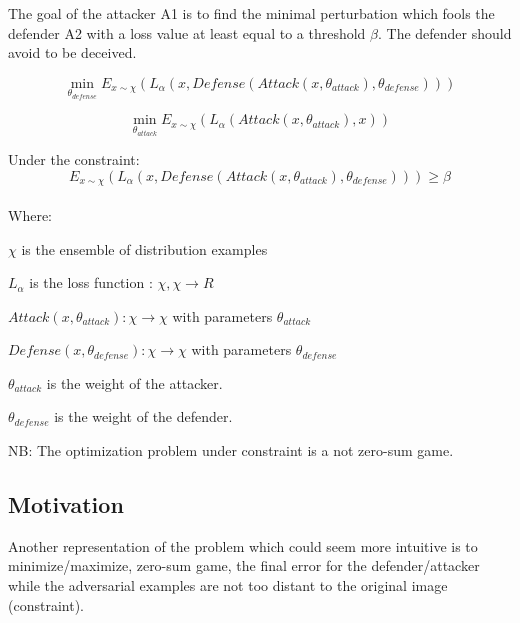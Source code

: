 \documentclass[12pt]{article}
\begin{document}
\begin{center}
\end{center}

The goal of the attacker A1 is to find the minimal perturbation which fools the defender A2 with a loss value at least equal to a threshold $\beta$. The defender should avoid to be deceived.

\begin{equation}\label{eq:defense}
\min_{\theta_{defense}} E_{x \sim \chi}(L_{\alpha}(x, Defense(Attack(x,\theta_{attack} ),\theta_{defense})))
\end{equation}

\begin{equation}\label{eq:attack}
\min_{\theta_{attack}} E_{x \sim \chi}(L_{\alpha}(Attack(x, \theta_{attack}), x))
\end{equation}

Under the constraint:
\begin{equation}\label{eq:constraint}
E_{x \sim \chi}(L_{\alpha}(x, Defense(Attack(x, \theta_{attack}), \theta_{defense}))) \geq \beta
\end{equation}

\paragraph{}
Where:

\setlength{\parindent}{15ex}
$\chi$ is the ensemble of distribution examples 

$L_{\alpha}$ is the loss function : $\chi, \chi \to R$

$Attack(x, \theta_{attack}): \chi \to \chi$ with parameters $\theta_{attack}$

$Defense(x, \theta_{defense}): \chi \to \chi$ with parameters $\theta_{defense}$

$\theta_{attack}$ is the weight of the attacker.

$\theta_{defense}$ is the weight of the defender.

\setlength{\parindent}{0ex}
NB: The optimization problem under constraint is a not zero-sum game.
\\
\subsection{Motivation}
Another representation of the problem which could seem more intuitive is to minimize/maximize, zero-sum game, the final error for the defender/attacker while the adversarial examples are not too distant to the original image (constraint).
\end{document}
